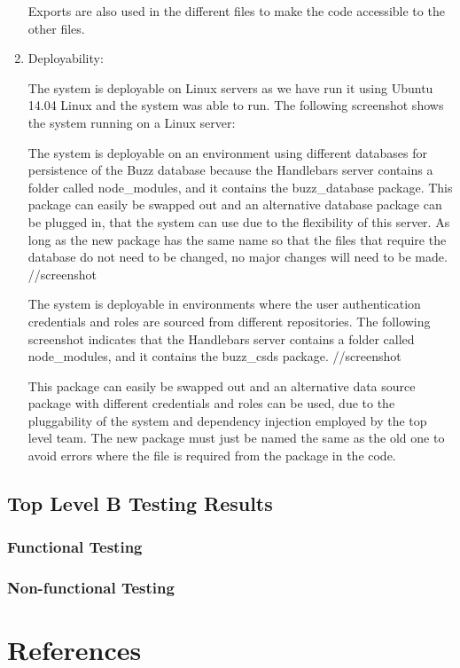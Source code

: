 \documentclass[hidelinks, 12pt, oneside]{article}
\begin{document}
\begin{enumerate}
Exports are also used in the different files to make the code accessible to the other files.

\item Deployability:

The system is deployable on Linux servers as we have run it using Ubuntu 14.04 Linux and the system was able to run. The following screenshot shows the system running on a Linux server:

The system is deployable on an environment using different databases for persistence of the Buzz database because the Handlebars server contains a folder called node\_modules, and it contains the buzz\_database package. This package can easily be swapped out and an alternative database package can be plugged in, that the system can use due to the flexibility of this server. As long as the new package has the same name so that the files that require the database do not need to be changed, no major changes will need to be made.  
//screenshot

The system is deployable in environments where the user authentication credentials and roles are sourced from different repositories. The following screenshot indicates that the Handlebars server contains a folder called node\_modules, and it contains the buzz\_csds package. 
//screenshot

This package can easily be swapped out and an alternative data source package with different credentials and roles can be used, due to the pluggability of the system and dependency injection employed by the top level team. The new package must just be named the same as the old one to avoid errors where the file is required from the package in the code. 

\end{enumerate}


\subsection{Top Level B Testing Results}

\subsubsection{Functional Testing}

\begin{enumerate}


\end{enumerate}

\subsubsection{Non-functional Testing} 

\begin{enumerate}






\end{enumerate}

\newpage
\section{References}
\end{document}
